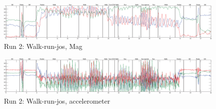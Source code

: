 \begin{figure}
\centering
  \includegraphics[width=1\textwidth]{./Figures/chapter6/data_collection/run-2-walk-run-jos/data_plot_mag_annotated.eps}
  \caption[R2: mag]{Run 2: Walk-run-jos, Mag}
\end{figure}

\begin{figure}
\centering
  \includegraphics[width=1\textwidth]{./Figures/chapter6/data_collection/run-2-walk-run-jos/data_plot_acc_annotated.eps}
  \caption[R2: accelerometer]{Run 2: Walk-run-jos, accelerometer}
\end{figure}